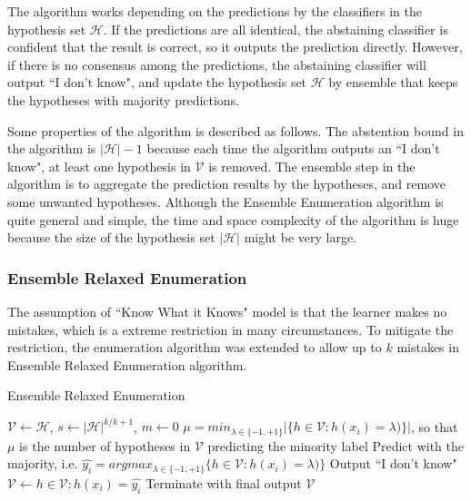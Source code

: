 \documentclass[12pt, journal]{IEEEtran}
\begin{document}
The algorithm works depending on the predictions by the classifiers in the hypothesis set $\mathcal{H}$.
If the predictions are all identical, the abstaining classifier is confident that the result is correct, so it outputs the prediction directly.
However, if there is no consensus among the predictions, the abstaining classifier will output ``I don't know", and update the hypothesis set $\mathcal{H}$ by ensemble that keeps the hypotheses with majority predictions. 

Some properties of the algorithm is described as follows.
The abstention bound in the algorithm is $|\mathcal{H}|-1$ because each time the algorithm outputs an ``I don't know", at least one hypothesis in $\mathcal{V}$ is removed. 
The ensemble step in the algorithm is to aggregate the prediction results by the hypotheses, and remove some unwanted  hypotheses.
Although the Ensemble Enumeration algorithm is quite general and simple, the time and space complexity of the algorithm is huge because the size of the hypothesis set $|\mathcal{H}|$ might be very large.

\subsubsection{Ensemble Relaxed Enumeration}
The assumption of ``Know What it Knows" model is that the learner makes no mistakes, which is a extreme restriction in many circumstances. 
To mitigate the restriction, the enumeration algorithm was extended to allow up to $k$ mistakes in   Ensemble Relaxed Enumeration algorithm.
\begin{algorithm}[h]
  \caption{Ensemble Relaxed Enumeration}
  \begin{algorithmic}[1]
   \State $\mathcal{V} \gets \mathcal{H}$, $s \gets |\mathcal{H}|^{k/k+1}$, $m \gets 0$
      \State $\mu = min_{\lambda\in \{-1,+1\}} |\{h \in \mathcal{V}: h(x_i)=\lambda)\}|$, so that $\mu$ is the number of hypotheses in $\mathcal{V}$ predicting the minority label
      \State Predict with the majority, i.e. $\hat{y_{i}} = argmax_{\lambda\in \{-1,+1\} } \{h \in \mathcal{V}: h(x_i)=\lambda)\}$
      \Else 
      \State Output ``I don't know"
      \State $\mathcal{V} \gets {h \in \mathcal{V}:h(x_i)=\hat{y_{i}}}$
      \EndIf
      \State Terminate with final output $\mathcal{V}$
      \EndIf
    \EndFor
  \end{algorithmic}
\end{algorithm}
\end{document}
